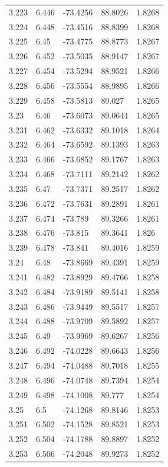 \begin{tabular}{lllll}
3.223 & 6.446 & -73.4256 & 88.8026 & 1.8268 \\
3.224 & 6.448 & -73.4516 & 88.8399 & 1.8268 \\
3.225 & 6.45 & -73.4775 & 88.8773 & 1.8267 \\
3.226 & 6.452 & -73.5035 & 88.9147 & 1.8267 \\
3.227 & 6.454 & -73.5294 & 88.9521 & 1.8266 \\
3.228 & 6.456 & -73.5554 & 88.9895 & 1.8266 \\
3.229 & 6.458 & -73.5813 & 89.027 & 1.8265 \\
3.23 & 6.46 & -73.6073 & 89.0644 & 1.8265 \\
3.231 & 6.462 & -73.6332 & 89.1018 & 1.8264 \\
3.232 & 6.464 & -73.6592 & 89.1393 & 1.8263 \\
3.233 & 6.466 & -73.6852 & 89.1767 & 1.8263 \\
3.234 & 6.468 & -73.7111 & 89.2142 & 1.8262 \\
3.235 & 6.47 & -73.7371 & 89.2517 & 1.8262 \\
3.236 & 6.472 & -73.7631 & 89.2891 & 1.8261 \\
3.237 & 6.474 & -73.789 & 89.3266 & 1.8261 \\
3.238 & 6.476 & -73.815 & 89.3641 & 1.826 \\
3.239 & 6.478 & -73.841 & 89.4016 & 1.8259 \\
3.24 & 6.48 & -73.8669 & 89.4391 & 1.8259 \\
3.241 & 6.482 & -73.8929 & 89.4766 & 1.8258 \\
3.242 & 6.484 & -73.9189 & 89.5141 & 1.8258 \\
3.243 & 6.486 & -73.9449 & 89.5517 & 1.8257 \\
3.244 & 6.488 & -73.9709 & 89.5892 & 1.8257 \\
3.245 & 6.49 & -73.9969 & 89.6267 & 1.8256 \\
3.246 & 6.492 & -74.0228 & 89.6643 & 1.8256 \\
3.247 & 6.494 & -74.0488 & 89.7018 & 1.8255 \\
3.248 & 6.496 & -74.0748 & 89.7394 & 1.8254 \\
3.249 & 6.498 & -74.1008 & 89.777 & 1.8254 \\
3.25 & 6.5 & -74.1268 & 89.8146 & 1.8253 \\
3.251 & 6.502 & -74.1528 & 89.8521 & 1.8253 \\
3.252 & 6.504 & -74.1788 & 89.8897 & 1.8252 \\
3.253 & 6.506 & -74.2048 & 89.9273 & 1.8252 \\

\end{tabular}
